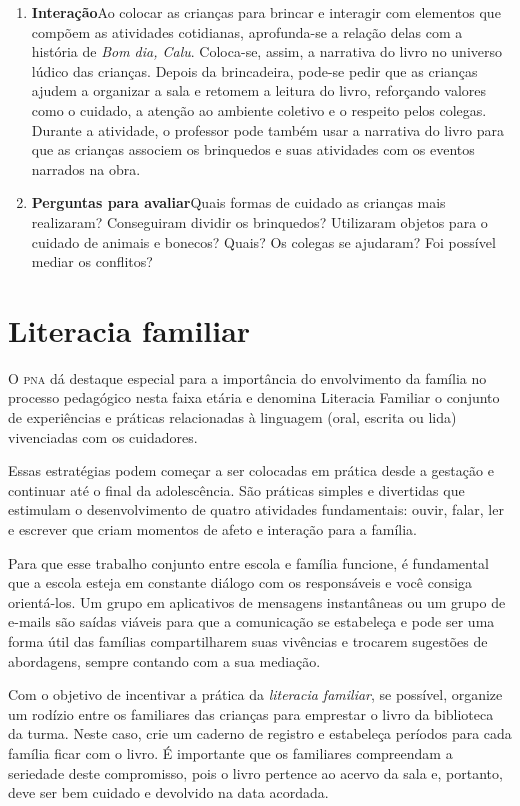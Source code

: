 \documentclass[11pt]{extarticle}
\begin{document}
\begin{enumerate}
\item \textbf{Interação}\quad Ao colocar as crianças para brincar e interagir com elementos que compõem as atividades cotidianas, aprofunda-se a relação delas com a história de \textit{Bom dia, Calu}. Coloca-se, assim, a narrativa do livro no universo lúdico das crianças. Depois da brincadeira, pode-se pedir que as crianças ajudem a organizar a sala e retomem a leitura do livro, reforçando valores como o cuidado, a atenção ao ambiente coletivo e o respeito pelos colegas. Durante a atividade, o professor pode também usar a narrativa do livro para que as crianças associem os brinquedos e suas atividades com os eventos narrados na obra.

\item \textbf{Perguntas para avaliar}\quad Quais formas de cuidado as crianças mais realizaram? Conseguiram dividir os brinquedos? Utilizaram  objetos para o cuidado de animais e bonecos? Quais? Os colegas se ajudaram? Foi possível mediar os conflitos?
\end{enumerate}

\section{Literacia familiar}
O \textsc{pna} dá destaque especial para a importância do envolvimento da família 
no processo pedagógico nesta faixa etária e denomina Literacia Familiar o conjunto 
de experiências e práticas relacionadas à linguagem (oral, escrita ou lida) vivenciadas 
com os cuidadores. 

Essas estratégias podem começar a ser colocadas em prática desde a 
gestação e continuar até o final da adolescência. São práticas simples e divertidas 
que estimulam o desenvolvimento de quatro atividades fundamentais: ouvir, falar, 
ler e escrever que criam momentos de afeto e interação para a família. 

Para que esse trabalho conjunto entre escola e família funcione, é 
fundamental que a escola esteja em constante diálogo com os responsáveis e 
você consiga orientá-los. Um grupo em aplicativos de mensagens instantâneas ou um 
grupo de e-mails são saídas viáveis para que a comunicação se estabeleça e pode ser 
uma forma útil das famílias compartilharem suas vivências e trocarem sugestões 
de abordagens, sempre contando com a sua mediação. 

Com o objetivo de incentivar 
a prática da \textit{literacia familiar}, se possível, organize um rodízio entre os familiares 
das crianças para emprestar o livro da biblioteca da turma. Neste caso, crie um caderno 
de registro e estabeleça períodos para cada família ficar com o livro. É importante 
que os familiares compreendam a seriedade deste compromisso, pois o livro pertence 
ao acervo da sala e, portanto, deve ser bem cuidado e devolvido na data acordada. 
\end{document}
